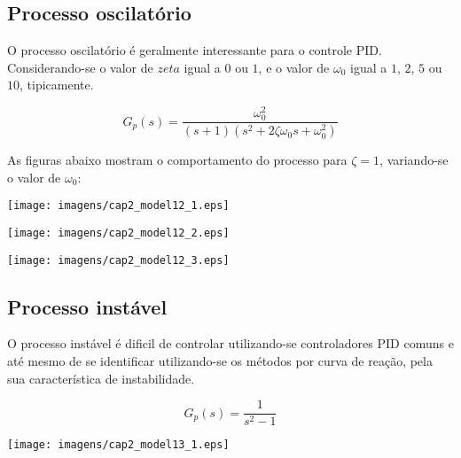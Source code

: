 \subsection{Processo oscilatório}

    O processo oscilatório é geralmente interessante para o controle \acs{PID}.
    Considerando-se o valor de $zeta$ igual a $0$ ou $1$, e o valor de $\omega _0$
    igual a $1$, $2$, $5$ ou $10$, tipicamente.

    \begin{equation}
        G_p(s) = \frac{\omega _0^2}{(s+1)(s^2+2\zeta \omega _0 s+\omega _0^2)}
    \end{equation}
    
    As figuras abaixo mostram o comportamento do processo para $\zeta = 1$,
    variando-se o valor de $\omega _0$:
    
    \begin{center}
        \texttt{[image: imagens/cap2\_model12\_1.eps]}
    \end{center}
    
    \begin{center}
        \texttt{[image: imagens/cap2\_model12\_2.eps]}
    \end{center}
    
    \begin{center}
        \texttt{[image: imagens/cap2\_model12\_3.eps]}
    \end{center}

\subsection{Processo instável}
    
    O processo instável é dificil de controlar utilizando-se controladores \ac{PID}
    comuns e até mesmo de se identificar utilizando-se os métodos por curva de
    reação, pela sua característica de instabilidade.
    
    \begin{equation}
        G_p(s) = \frac{1}{s^2 - 1}
    \end{equation}
    
    \begin{center}
        \texttt{[image: imagens/cap2\_model13\_1.eps]}
    \end{center}

